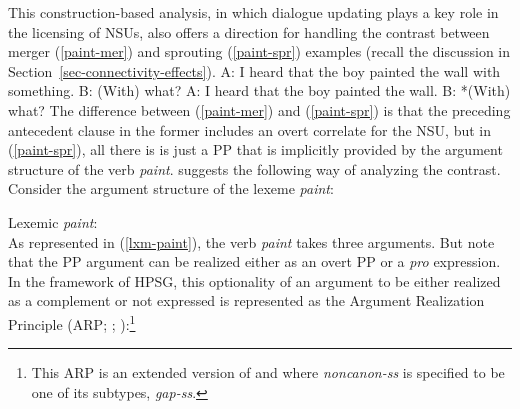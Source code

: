 This construction-based analysis, in which dialogue updating plays
a key role in the licensing of NSUs, also offers a direction
for handling the contrast between merger (\ref{paint-mer}) and sprouting (\ref{paint-spr}) examples (recall the discussion in Section~\ref{sec-connectivity-effects}). %
%
\eal
\ex A: I heard that the boy painted the wall with something. B: (With) what?  
\label{paint-mer}
\ex A: I heard that the boy painted the wall. B: *(With) what? \label{paint-spr}
\zl
%
The difference between (\ref{paint-mer}) and (\ref{paint-spr})  is that the preceding antecedent clause in the
former includes an overt correlate for the NSU, but in (\ref{paint-spr}), 
all there is is just a PP that is implicitly provided
by the argument structure 
of the verb \textit{paint}.
%
\citet{Kim2015} suggests the following way of analyzing the contrast. Consider the argument structure of the lexeme \textit{paint}:

\ea
\label{lxm-paint}
Lexemic \textit{paint}:\\
\z
%
%
As represented in (\ref{lxm-paint}), the verb \emph{paint}
takes three arguments. But
note that the PP argument can be realized
either as an overt PP or a \textit{pro} expression. In the framework of HPSG, this optionality of an argument to be either realized as a complement or not expressed is represented as the Argument Realization Principle  (ARP; \citealt{ginzburg-miller-ellipsis-handbook}; \crossrefchapteralt[\page \pageref{page-argument-realization-principle}]{properties}):\footnote{This
ARP is an extended version of \citet[171]{Ginzburg:Sag:2000} and \citet[11]{Bouma:Malouf:Sag:01} where \textit{noncanon-ss} is specified to be one of its subtypes, \textit{gap-ss}.}
%

